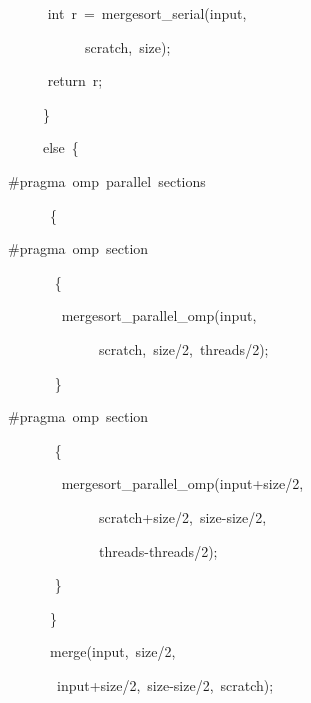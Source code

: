 \documentclass[copyright,creativecommons]{eptcs}
\newenvironment{lyxcode}
{\par\begin{list}{}{
\setlength{\rightmargin}{\leftmargin}
\setlength{\listparindent}{0pt}\raggedright
\setlength{\itemsep}{0pt}
\setlength{\parsep}{0pt}
\normalfont\ttfamily}\item[]}
{\end{list}}
\begin{document}
\begin{lyxcode}
\begin{algorithm}[H]
\begin{lyxcode}
{\small{}~~~~	~int~r~=~mergesort\_serial(input,~}{\small \par}

{\small{}~~~~~~~~~~~scratch,~size);}{\small \par}

{\small{}~~~~	~return~r;}{\small \par}

{\small{}~~~~~\}}{\small \par}

{\small{}~~~~~else~\{}{\small \par}

{\small \#pragma~omp~parallel~sections}{\small \par}

{\small{}~~~~~~\{}{\small \par}

{\small \#pragma~omp~section}{\small \par}

{\small{}~~~~	~~\{}{\small \par}

{\small{}~~~~	~~~mergesort\_parallel\_omp(input,~}{\small \par}

{\small{}~~~~~~~~~~~~~scratch,~size/2,~threads/2);}{\small \par}

{\small{}~~~~	~~\}}{\small \par}

{\small \#pragma~omp~section}{\small \par}

{\small{}~~~~	~~\{}{\small \par}

{\small{}~~~~	~~~mergesort\_parallel\_omp(input+size/2,~}{\small \par}

{\small{}~~~~~~~~~~~~~scratch+size/2,~size-size/2,~}{\small \par}

{\small{}~~~~~~~~~~~~~threads-threads/2);}{\small \par}

{\small{}~~~~	~~\}}{\small \par}

{\small{}~~~~~~\}}{\small \par}

{\small{}~~~~~~merge(input,~size/2,~}{\small \par}

{\small{}~~~~~~~input+size/2,~size-size/2,~scratch);}{\small \par}


\end{lyxcode}
\end{algorithm}
\end{lyxcode}
\end{document}
